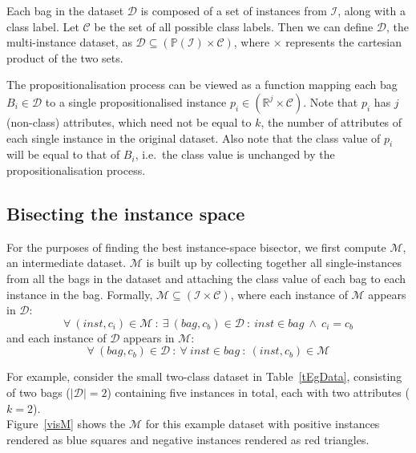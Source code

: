 \documentclass[a4paper,12pt]{article} %
\newcommand{\real}{\mathbb{R}}
\newcommand{\mcl}[1]{\mathcal{#1}}
\newcommand{\power}{\mathbb{P}}
\begin{document}
Each bag in the dataset $\mcl{D}$ is 
    composed of a set of instances from $\mcl{I}$,
    along with a class label. %
Let $\mcl{C}$ be the set of all possible class labels.
Then we can define $\mcl{D}$,
    the multi-instance dataset, as 
    $\mcl{D} \subseteq ( \power (\mcl{I}) \times \mcl{C} )$,
    where $\times$ represents the cartesian product of the two sets.

The propositionalisation process can be viewed as a function
    mapping each bag $B_i \in \mcl{D}$ to 
    a single propositionalised instance $p_i \in ( \real^j \times \mcl{C} )$.
Note that $p_i$ has $j$ (non-class) attributes, 
    which need not be equal to $k$, the number of attributes of 
    each single instance in the original dataset.
Also note that the class value of $p_i$ will be 
    equal to that of $B_i$,
    i.e.\ the class value is unchanged by the propositionalisation process.
       

\subsection{Bisecting the instance space}

For the purposes of finding the best instance-space bisector,
    we first compute $\mcl{M}$, an intermediate dataset.
$\mcl{M}$ is built up by collecting together all single-instances
    from all the bags in the dataset and 
    attaching the class value of each bag to 
    each instance in the bag.
Formally, $\mcl{M} \subseteq (\mcl{I} \times \mcl{C})$, 
    where each instance of $\mcl{M}$ appears in $\mcl{D}$:
    $$
        \forall~(inst,c_i)\in\mcl{M} ~:~ 
            \exists~(bag,c_b) \in \mcl{D} ~:~ 
                inst \in bag ~\land~ c_i = c_b
    $$
    and each instance of $\mcl{D}$ appears in $\mcl{M}$:
    $$
        \forall~(bag,c_b) \in \mcl{D} ~:~ 
            \forall~inst \in bag ~:~
                (inst,c_b) \in \mcl{M}
    $$    

For example, consider the small two-class dataset in Table~\ref{tEgData}, 
    consisting of two bags ($|\mcl{D}| = 2$)
    containing five instances in total, each with two attributes ($k=2$).\\
Figure~\ref{visM} shows the $\mcl{M}$ for this example dataset with 
    positive instances rendered as blue squares and 
    negative instances rendered as red triangles.
\end{document}
